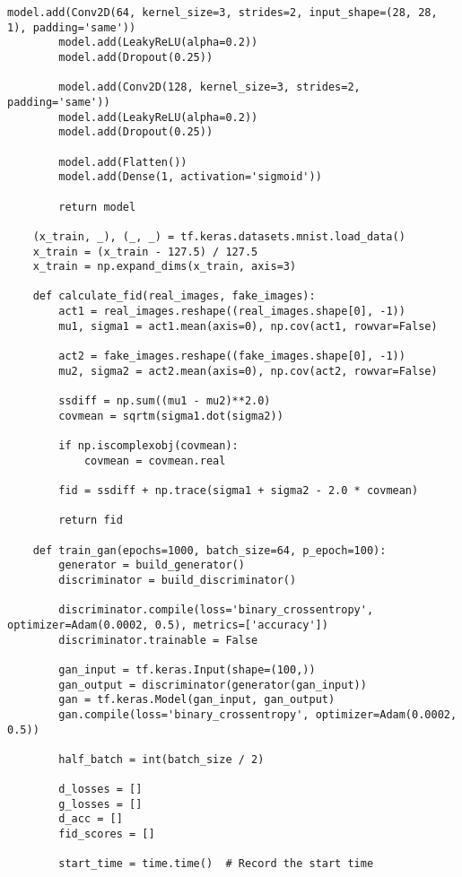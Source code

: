\begin{lstlisting}[style=mypython, caption=Explore GAN with more convolutional layers 3]
        model.add(Conv2D(64, kernel_size=3, strides=2, input_shape=(28, 28, 1), padding='same'))
        model.add(LeakyReLU(alpha=0.2))
        model.add(Dropout(0.25))
    
        model.add(Conv2D(128, kernel_size=3, strides=2, padding='same'))
        model.add(LeakyReLU(alpha=0.2))
        model.add(Dropout(0.25))
    
        model.add(Flatten())
        model.add(Dense(1, activation='sigmoid'))
    
        return model
    
    (x_train, _), (_, _) = tf.keras.datasets.mnist.load_data()
    x_train = (x_train - 127.5) / 127.5
    x_train = np.expand_dims(x_train, axis=3)
    
    def calculate_fid(real_images, fake_images):
        act1 = real_images.reshape((real_images.shape[0], -1))
        mu1, sigma1 = act1.mean(axis=0), np.cov(act1, rowvar=False)
        
        act2 = fake_images.reshape((fake_images.shape[0], -1))
        mu2, sigma2 = act2.mean(axis=0), np.cov(act2, rowvar=False)
        
        ssdiff = np.sum((mu1 - mu2)**2.0)
        covmean = sqrtm(sigma1.dot(sigma2))
        
        if np.iscomplexobj(covmean):
            covmean = covmean.real
        
        fid = ssdiff + np.trace(sigma1 + sigma2 - 2.0 * covmean)
        
        return fid
    
    def train_gan(epochs=1000, batch_size=64, p_epoch=100):
        generator = build_generator()
        discriminator = build_discriminator()
    
        discriminator.compile(loss='binary_crossentropy', optimizer=Adam(0.0002, 0.5), metrics=['accuracy'])
        discriminator.trainable = False
    
        gan_input = tf.keras.Input(shape=(100,))
        gan_output = discriminator(generator(gan_input))
        gan = tf.keras.Model(gan_input, gan_output)
        gan.compile(loss='binary_crossentropy', optimizer=Adam(0.0002, 0.5))
    
        half_batch = int(batch_size / 2)
        
        d_losses = []
        g_losses = []
        d_acc = []
        fid_scores = []
        
        start_time = time.time()  # Record the start time
    

\end{lstlisting}
